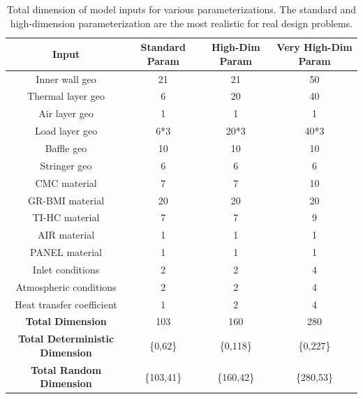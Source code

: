 \documentclass{article}
\begin{document}
\begin{table}
\caption[Dimensions of model inputs]{Total dimension of model inputs for various parameterizations. The standard and high-dimension parameterization are the most realistic for real design problems.}
\label{tab:inputDimension}
\begin{center}
\begin{tabular}[]{ c | c | c | c}
\textbf{Input} & \textbf{Standard Param} & \textbf{High-Dim Param} & \textbf{Very High-Dim Param}\\ \hline
Inner wall geo            & 21  & 21   & 50   \\ \hline
Thermal layer geo         & 6   & 20   & 40   \\ \hline
Air layer geo             & 1   & 1    & 1    \\ \hline
Load layer geo            & 6*3 & 20*3 & 40*3 \\ \hline
Baffle geo                & 10  & 10   & 10   \\ \hline
Stringer geo              & 6   & 6    & 6    \\ \hline
CMC material              & 7   & 7    & 10   \\ \hline
GR-BMI material           & 20  & 20   & 20   \\ \hline
TI-HC material            & 7   & 7    & 9    \\ \hline
AIR material              & 1   & 1    & 1    \\ \hline
PANEL material            & 1   & 1    & 1    \\ \hline
Inlet conditions          & 2   & 2    & 4    \\ \hline
Atmospheric conditions    & 2   & 2    & 4    \\ \hline
Heat transfer coefficient & 1   & 2    & 4    \\ \hline \hline
\textbf{Total Dimension}  & 103 & 160  & 280  \\ \hline
\textbf{Total Deterministic Dimension} & \{0,62\} & \{0,118\} & \{0,227\} \\ \hline
\textbf{Total Random Dimension} & \{103,41\} & \{160,42\} & \{280,53\} \\ \hline
\end{tabular}
\end{center}
\end{table}
\end{document}
